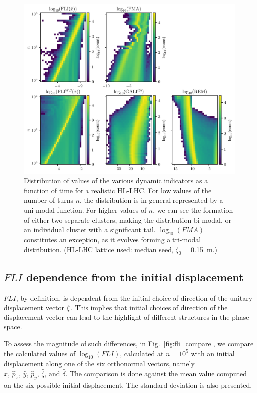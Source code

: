 \begin{figure}
    \centering
    \includegraphics[width=1.0\textwidth]{6_lhc_dynamic_indicators/figs/evolution.png}
    \caption{Distribution of values of the various dynamic indicators as a function of time for a realistic HL-LHC. For low values of the number of turns $n$, the distribution is in general represented by a uni-modal function. For higher values of $n$, we can see the formation of either two separate clusters, making the distribution bi-modal, or an individual cluster with a significant tail. $\log_{10}(FMA)$ constitutes an exception, as it evolves forming a tri-modal distribution. (HL-LHC lattice used: median seed, $\zeta_0=$\SI{0.15}{\meter}.)}
    \label{fig:overview2}
\end{figure}

\subsection{$FLI$ dependence from the initial displacement}

$FLI$, by definition, is dependent from the initial choice of direction of the unitary displacement vector $\vb{\xi}$. This implies that initial choices of direction of the displacement vector can lead to the highlight of different structures in the phase-space.

To assess the magnitude of such differences, in Fig.~\ref{fig:fli_compare}, we compare the calculated values of $\log_{10}({FLI})$, calculated at $n=10^5$ with an initial displacement along one of the six orthonormal vectors, namely $\hat{x},\,\hat{p}_x,\,\hat{y},\,\hat{p}_y,\,\hat{\zeta},\,\text{and }\hat{\delta}$. The comparison is done against the mean value computed on the six possible initial displacement. The standard deviation is also presented.


